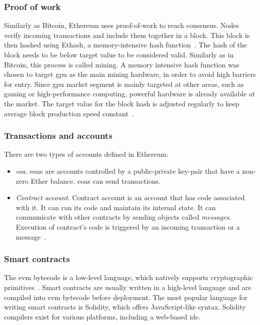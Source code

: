 \subsubsection{Proof of work}
Similarly as Bitcoin, Ethereum uses proof-of-work to reach consensus. Nodes verify incoming transactions and include them together in a block. This block is then hashed using Ethash, a memory-intensive hash function~\cite[p. 211]{Tikhomirov2018Ethereum:Perspectives}. The hash of the block needs to be below target value to be considered valid. Similarly as in Bitcoin, this process is called mining.  A memory intensive hash function was chosen to target \acrshort{gpu} as the main mining hardware, in order to avoid high barriers for entry. Since \acrshort{gpu} market segment is mainly targeted at other areas, such as gaming or high-performance computing, powerful hardware is already available at the market\footnotemark. The target value for the block hash is adjusted regularly to keep average block production speed constant~\cite{Tikhomirov2018Ethereum:Perspectives}.
% 

\subsubsection{Transactions and accounts}
There are two types of accounts defined in Ethereum:
\begin{itemize}[noitemsep]
    \item \textit{\acrfull{eoa}}. \acrshort{eoa}s are accounts controlled by a public-private key-pair that have a non-zero Ether balance. \acrshort{eoa}s can send transactions.~\cite{EthereumCommunityEthereumDocumentation}
    \item \textit{Contract account}. Contract account is an account that has code associated with it. It can run its code and maintain its internal state. It can communicate with other contracts by sending objects called \textit{messages}. Execution of contract's code is triggered by an incoming transaction or a message~\cite{EthereumCommunityEthereumDocumentation}.
\end{itemize}

\subsubsection{Smart contracts}
The \acrshort{evm} bytecode is a low-level language, which natively supports cryptographic primitives~\cite{Tikhomirov2018Ethereum:Perspectives}. Smart contracts are usually written in a high-level language and are compiled into \acrshort{evm} bytecode before deployment. The most popular language for writing smart contracts is Solidity, which offers JavaScript-like syntax. Solidity compilers exist for various platforms, including a web-based \acrshort{ide}.

